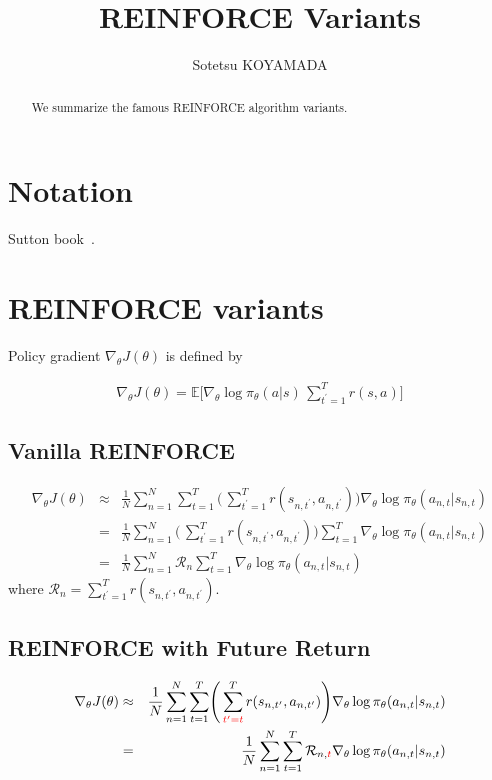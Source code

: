 \documentclass{article}
\title{REINFORCE Variants}
\author{
Sotetsu KOYAMADA
}
\begin{document}
\maketitle

\begin{abstract}
We summarize the famous REINFORCE algorithm variants.
\end{abstract}

\section{Notation}
Sutton book~\cite{Sutton2018-ij}.

\section{REINFORCE variants}

Policy gradient $\nabla_\theta J(\theta)$ is defined by

\begin{eqnarray}
\nabla_\theta J(\theta) 
= \mathbb{E} \Biggl[ \nabla_\theta \log \pi_\theta (a|s) \,\sum_{t^\prime=1}^T r(s, a) \Biggr]
\end{eqnarray}

\subsection{Vanilla REINFORCE}

\begin{eqnarray}
\nabla_\theta J(\theta) 
&\approx& \frac{1}{N} \sum_{n=1}^{N} \sum_{t=1}^{T} \Biggl(\, \sum_{t^\prime=1}^T r(s_{n, t^\prime}, a_{n, t^\prime}) \Biggr) \nabla_\theta \log \pi_\theta (a_{n, t}|s_{n, t}) \\
&=& \frac{1}{N} \sum_{n=1}^{N} \Biggl(\, \sum_{t^\prime=1}^T r(s_{n, t^\prime}, a_{n, t^\prime}) \Biggr)\sum_{t=1}^{T} \nabla_\theta \log \pi_\theta (a_{n, t}|s_{n, t}) \\
&=& \frac{1}{N} \sum_{n=1}^{N} \mathcal{R}_n \sum_{t=1}^{T} \nabla_\theta \log \pi_\theta (a_{n, t}|s_{n, t}) 
\end{eqnarray}
where $\mathcal{R}_{n} = \sum_{t^\prime=1}^T r(s_{n, t^\prime}, a_{n, t^\prime})$.

\subsection{REINFORCE with Future Return}

\begin{eqnarray}
\nabla_\theta J(\theta) 
&\approx& \frac{1}{N} \sum_{n=1}^{N} \sum_{t=1}^{T}  \Biggl(\, \sum_{{\color{red}{t^\prime=t}}}^{T} r(s_{n, t^\prime}, a_{n, t^\prime}) \Biggr) \nabla_\theta \log \pi_\theta (a_{n, t}|s_{n, t})\\
&=& \frac{1}{N} \sum_{n=1}^{N} \sum_{t=1}^{T} \mathcal{R}_{n, {\color{red}{t}}} \nabla_\theta \log \pi_\theta (a_{n, t}|s_{n, t}) 
\end{eqnarray}
\end{document}
